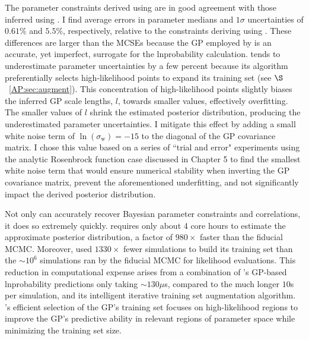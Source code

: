 The parameter constraints derived using \approxposterior are in good agreement with those inferred using \emcee. I find average errors in parameter medians and $1\sigma$ uncertainties of $0.61\%$ and $5.5\%$, respectively, relative to the constraints deriving using \emcee. These differences are larger than the MCSEs because the GP employed by \approxposterior is an accurate, yet imperfect, surrogate for the lnprobability calculation. \approxposterior tends to underestimate parameter uncertainties by a few percent because its algorithm preferentially selects high-likelihood points to expand its training set (see $\S$~\ref{AP:sec:augment}). This concentration of high-likelihood points slightly biases the inferred GP scale lengths, $l$, towards smaller values, effectively overfitting. The smaller values of $l$ shrink the estimated posterior distribution, producing the underestimated parameter uncertainties. I mitigate this effect by adding a small white noise term of $\ln(\sigma_{\mathrm{w}}) = -15$ to the diagonal of the GP covariance matrix. I chose this value based on a series of ``trial and error" experiments using the analytic Rosenbrock function case discussed in Chapter 5 to find the smallest white noise term that would ensure numerical stability when inverting the GP covariance matrix, prevent the aforementioned underfitting, and not significantly impact the derived posterior distribution.

Not only can \approxposterior accurately recover Bayesian parameter constraints and correlations, it does so extremely quickly. \approxposterior requires only about 4 core hours to estimate the approximate posterior distribution, a factor of $980\times$ faster than the fiducial MCMC. Moreover, \approxposterior used $1330\times$ fewer \vplanet simulations to build its training set than the ${\sim}10^6$ simulations ran by the fiducial MCMC for likelihood evaluations. This reduction in computational expense arises from a combination of \approxposterior's GP-based lnprobability predictions only taking ${\sim}130\mu$s, compared to the much longer $10$s per \vplanet simulation, and its intelligent iterative training set augmentation algorithm. \approxposterior's efficient selection of the GP's training set focuses on high-likelihood regions to improve the GP's predictive ability in relevant regions of parameter space while minimizing the training set size.

